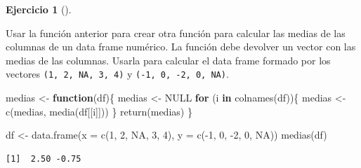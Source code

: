 \documentclass[
  spanish,
  a4paper,
]{scrreport}
\newenvironment{Shaded}{\begin{snugshade}}{\end{snugshade}}
\newcommand{\AttributeTok}[1]{\textcolor[rgb]{0.40,0.45,0.13}{#1}}
\newcommand{\ConstantTok}[1]{\textcolor[rgb]{0.56,0.35,0.01}{#1}}
\newcommand{\ControlFlowTok}[1]{\textcolor[rgb]{0.00,0.23,0.31}{\textbf{#1}}}
\newcommand{\DecValTok}[1]{\textcolor[rgb]{0.68,0.00,0.00}{#1}}
\newcommand{\FunctionTok}[1]{\textcolor[rgb]{0.28,0.35,0.67}{#1}}
\newcommand{\NormalTok}[1]{\textcolor[rgb]{0.00,0.23,0.31}{#1}}
\newcommand{\OtherTok}[1]{\textcolor[rgb]{0.00,0.23,0.31}{#1}}
\newcommand{\SpecialCharTok}[1]{\textcolor[rgb]{0.37,0.37,0.37}{#1}}
\theoremstyle{definition}
\newtheorem{exercise}{Ejercicio}[chapter]
\theoremstyle{definition}
\theoremstyle{remark}
\begin{document}
\begin{exercise}[]\protect\hypertarget{exr-funciones-2}{}\label{exr-funciones-2}

Usar la función anterior para crear otra función para calcular las
medias de las columnas de un data frame numérico. La función debe
devolver un vector con las medias de las columnas. Usarla para calcular
el data frame formado por los vectores \texttt{(1,\ 2,\ NA,\ 3,\ 4)} y
\texttt{(-1,\ 0,\ -2,\ 0,\ NA)}.

\begin{tcolorbox}[enhanced jigsaw, arc=.35mm, bottomrule=.15mm, bottomtitle=1mm, breakable, colback=white, colbacktitle=quarto-callout-note-color!10!white, colframe=quarto-callout-note-color-frame, coltitle=black, left=2mm, leftrule=.75mm, opacityback=0, opacitybacktitle=0.6, rightrule=.15mm, title=\textcolor{quarto-callout-note-color}{\faInfo}\hspace{0.5em}{Solución}, titlerule=0mm, toprule=.15mm, toptitle=1mm]

\begin{Shaded}
\begin{Highlighting}[]
\NormalTok{medias }\OtherTok{\textless{}{-}} \ControlFlowTok{function}\NormalTok{(df)\{}
\NormalTok{medias }\OtherTok{\textless{}{-}} \ConstantTok{NULL}
\ControlFlowTok{for}\NormalTok{ (i }\ControlFlowTok{in} \FunctionTok{colnames}\NormalTok{(df))\{}
\NormalTok{  medias }\OtherTok{\textless{}{-}} \FunctionTok{c}\NormalTok{(medias, }\FunctionTok{media}\NormalTok{(df[[i]]))}
\NormalTok{\}}
\FunctionTok{return}\NormalTok{(medias)}
\NormalTok{\}}

\NormalTok{df }\OtherTok{\textless{}{-}} \FunctionTok{data.frame}\NormalTok{(}\AttributeTok{x =} \FunctionTok{c}\NormalTok{(}\DecValTok{1}\NormalTok{, }\DecValTok{2}\NormalTok{, }\ConstantTok{NA}\NormalTok{, }\DecValTok{3}\NormalTok{, }\DecValTok{4}\NormalTok{), }\AttributeTok{y =} \FunctionTok{c}\NormalTok{(}\SpecialCharTok{{-}}\DecValTok{1}\NormalTok{, }\DecValTok{0}\NormalTok{, }\SpecialCharTok{{-}}\DecValTok{2}\NormalTok{, }\DecValTok{0}\NormalTok{, }\ConstantTok{NA}\NormalTok{))}
\FunctionTok{medias}\NormalTok{(df)}
\end{Highlighting}
\end{Shaded}

\begin{verbatim}
[1]  2.50 -0.75
\end{verbatim}

\end{tcolorbox}

\end{exercise}
\end{document}
